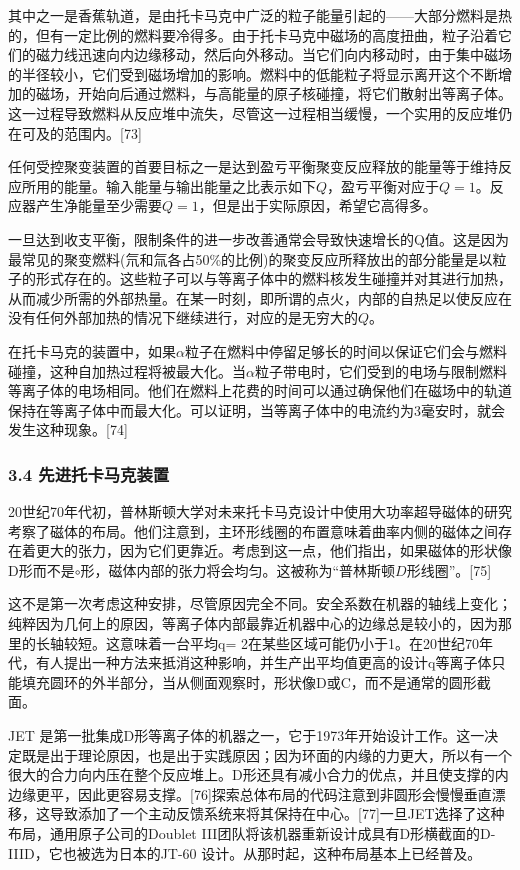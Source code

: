 其中之一是香蕉轨道，是由托卡马克中广泛的粒子能量引起的——大部分燃料是热的，但有一定比例的燃料要冷得多。由于托卡马克中磁场的高度扭曲，粒子沿着它们的磁力线迅速向内边缘移动，然后向外移动。当它们向内移动时，由于集中磁场的半径较小，它们受到磁场增加的影响。燃料中的低能粒子将显示离开这个不断增加的磁场，开始向后通过燃料，与高能量的原子核碰撞，将它们散射出等离子体。这一过程导致燃料从反应堆中流失，尽管这一过程相当缓慢，一个实用的反应堆仍在可及的范围内。[73]

任何受控聚变装置的首要目标之一是达到盈亏平衡聚变反应释放的能量等于维持反应所用的能量。输入能量与输出能量之比表示如下$Q$，盈亏平衡对应于$Q=1$。反应器产生净能量至少需要$Q=1$，但是出于实际原因，希望它高得多。

一旦达到收支平衡，限制条件的进一步改善通常会导致快速增长的Q值。这是因为最常见的聚变燃料(氘和氚各占50\%的比例)的聚变反应所释放出的部分能量是以粒子的形式存在的。这些粒子可以与等离子体中的燃料核发生碰撞并对其进行加热，从而减少所需的外部热量。在某一时刻，即所谓的点火，内部的自热足以使反应在没有任何外部加热的情况下继续进行，对应的是无穷大的$Q$。

在托卡马克的装置中，如果$\alpha$粒子在燃料中停留足够长的时间以保证它们会与燃料碰撞，这种自加热过程将被最大化。当$\alpha$粒子带电时，它们受到的电场与限制燃料等离子体的电场相同。他们在燃料上花费的时间可以通过确保他们在磁场中的轨道保持在等离子体中而最大化。可以证明，当等离子体中的电流约为3毫安时，就会发生这种现象。[74]
\subsubsection{3.4 先进托卡马克装置}
20世纪70年代初，普林斯顿大学对未来托卡马克设计中使用大功率超导磁体的研究考察了磁体的布局。他们注意到，主环形线圈的布置意味着曲率内侧的磁体之间存在着更大的张力，因为它们更靠近。考虑到这一点，他们指出，如果磁体的形状像D形而不是$\circ$形，磁体内部的张力将会均匀。这被称为“普林斯顿$D$形线圈”。[75]

这不是第一次考虑这种安排，尽管原因完全不同。安全系数在机器的轴线上变化；纯粹因为几何上的原因，等离子体内部最靠近机器中心的边缘总是较小的，因为那里的长轴较短。这意味着一台平均q= 2在某些区域可能仍小于1。在20世纪70年代，有人提出一种方法来抵消这种影响，并生产出平均值更高的设计q等离子体只能填充圆环的外半部分，当从侧面观察时，形状像D或C，而不是通常的圆形截面。

JET 是第一批集成D形等离子体的机器之一，它于1973年开始设计工作。这一决定既是出于理论原因，也是出于实践原因；因为环面的内缘的力更大，所以有一个很大的合力向内压在整个反应堆上。D形还具有减小合力的优点，并且使支撑的内边缘更平，因此更容易支撑。[76]探索总体布局的代码注意到非圆形会慢慢垂直漂移，这导致添加了一个主动反馈系统来将其保持在中心。[77]一旦JET选择了这种布局，通用原子公司的Doublet III团队将该机器重新设计成具有D形横截面的D-IIID，它也被选为日本的JT-60 设计。从那时起，这种布局基本上已经普及。

